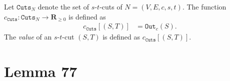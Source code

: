 \documentclass{article}
\begin{document}
\begin{definition}
    Let $\texttt{Cuts}_N$ denote the set of $s$-$t$-cuts of $N=(V, E, c, s, t)$. The function $c_{\texttt{Cuts}}:\texttt{Cuts}_N \to \mathbf{R}_{\geq 0}$ is defined as
    \begin{align*}
        c_{\texttt{Cuts}}[(S, T)] &= \texttt{Out}_c(S).
    \end{align*}
    The \textit{value} of an $s$-$t$-cut $(S, T)$ is defined as $c_{\texttt{Cuts}}[(S, T)]$.
\end{definition}


\newpage
\section{Lemma 77}
\end{document}
